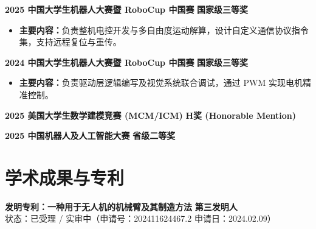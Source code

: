 \documentclass[11pt,a4paper]{article}
\begin{document}
\textbf{2025 中国大学生机器人大赛暨 RoboCup 中国赛} \hfill \textbf{国家级三等奖}

\begin{itemize}[leftmargin=1.5em, noitemsep, topsep=2pt]
    \item \textbf{主要内容：}负责整机电控开发与多自由度运动解算，设计自定义通信协议指令集，支持远程复位与重传。
\end{itemize}

\textbf{2024 中国大学生机器人大赛暨 RoboCup 中国赛} \hfill \textbf{国家级三等奖}

\begin{itemize}[leftmargin=1.5em, noitemsep, topsep=2pt]
    \item \textbf{主要内容：}负责驱动层逻辑编写及视觉系统联合调试，通过 PWM 实现电机精准控制。
\end{itemize}

\textbf{2025 美国大学生数学建模竞赛 (MCM/ICM)} \hfill \textbf{H奖 (Honorable Mention)}

\textbf{2025 中国机器人及人工智能大赛 } \hfill \textbf{省级二等奖}


\section{学术成果与专利}
\textbf{发明专利：一种用于无人机的机械臂及其制造方法} \hfill \textbf{第三发明人} \\
{\small 状态：已受理 / 实审中（申请号：202411624467.2 \quad 申请日：2024.02.09）}
\end{document}
